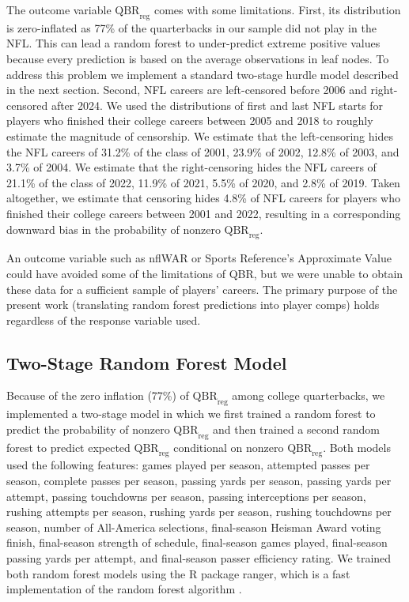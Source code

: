 \documentclass[Review, sageh, times, doublespace]{sagej}
\begin{document}
  The outcome variable $\text{QBR}_\text{reg}$ comes with some limitations. First, its distribution is zero-inflated as 77\% of the quarterbacks in our sample did not play in the NFL. This can lead a random forest to under-predict extreme positive values because every prediction is based on the average observations in leaf nodes. To address this problem we implement a standard two-stage hurdle model described in the next section. Second, NFL careers are left-censored before 2006 and right-censored after 2024. We used the distributions of first and last NFL starts for players who finished their college careers between 2005 and 2018 to roughly estimate the magnitude of censorship. We estimate that the left-censoring hides the NFL careers of 31.2\% of the class of 2001, 23.9\% of 2002, 12.8\% of 2003, and 3.7\% of 2004. We estimate that the right-censoring hides the NFL careers of 21.1\% of the class of 2022, 11.9\% of 2021, 5.5\% of 2020, and 2.8\% of 2019. Taken altogether, we estimate that censoring hides 4.8\% of NFL careers for players who finished their college careers between 2001 and 2022, resulting in a corresponding downward bias in the probability of nonzero $\text{QBR}_\text{reg}$.

An outcome variable such as nflWAR \citep{yurko_nflwar_2019} or Sports Reference's Approximate Value could have avoided some of the limitations of QBR, but we were unable to obtain these data for a sufficient sample of players' careers. The primary purpose of the present work (translating random forest predictions into player comps) holds regardless of the response variable used.

\subsection{Two-Stage Random Forest Model}

Because of the zero inflation (77\%) of $\text{QBR}_\text{reg}$ among college quarterbacks, we implemented a two-stage model in which we first trained a random forest to predict the probability of nonzero $\text{QBR}_\text{reg}$ and then trained a second random forest to predict expected $\text{QBR}_\text{reg}$ conditional on nonzero $\text{QBR}_\text{reg}$. Both models used the following features: games played per season, attempted passes per season, complete passes per season, passing yards per season, passing yards per attempt, passing touchdowns per season, passing interceptions per season, rushing attempts per season, rushing yards per season, rushing touchdowns per season, number of All-America selections, final-season Heisman Award voting finish, final-season strength of schedule, final-season games played, final-season passing yards per attempt, and final-season passer efficiency rating. We trained both random forest models using the R package ranger, which is a fast implementation of the random forest algorithm \citep{wright_ranger_2017}.
\end{document}
